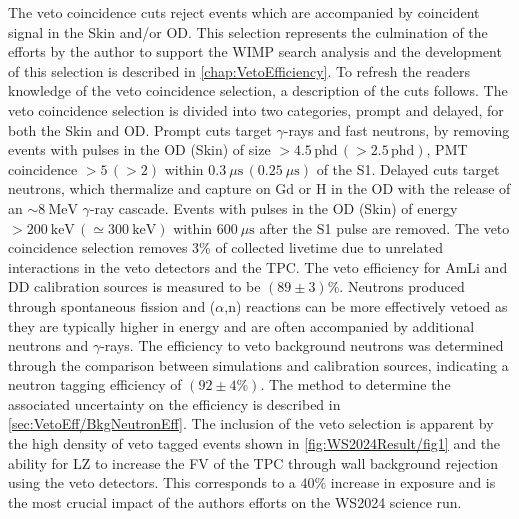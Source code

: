 The veto coincidence cuts reject events which are accompanied by coincident signal in the Skin and/or OD. This selection represents the culmination of the efforts by the author to support the WIMP search analysis and the development of this selection is described in \autoref{chap:VetoEfficiency}. To refresh the readers knowledge of the veto coincidence selection, a description of the cuts follows. 
The veto coincidence selection is divided into  two categories, prompt and delayed, for both the Skin and OD. Prompt cuts target $\gamma$-rays and fast neutrons, by removing events with pulses in the OD (Skin) of size $>4.5\,\text{phd}\,(>2.5\,\text{phd})$, PMT coincidence $>5\,(>2)$ within $0.3~\mu \text{s}\,(0.25~\mu \text{s})$ of the S1. Delayed cuts target neutrons, which thermalize and capture on Gd or H in the OD with the release of an $\sim8~\text{MeV}$ $\gamma$-ray cascade. Events with pulses in the OD (Skin) of energy $>200~\text{keV}\,(\simeq300~\text{keV})$ within $600~\mu\text{s}$ after the S1 pulse are removed. The veto coincidence selection removes $3\%$ of collected livetime due to unrelated interactions in the veto detectors and the TPC. The veto efficiency for AmLi and DD calibration sources is measured to be $(89\pm3)\%$. Neutrons produced through spontaneous fission and ($\alpha$,n) reactions can be more effectively vetoed as they are typically higher in energy and are often accompanied by additional neutrons and $\gamma$-rays. The efficiency to veto background neutrons was determined through the comparison between simulations and calibration sources, indicating a neutron tagging efficiency of  $(92\pm4\%)$. The method to determine the associated uncertainty on the efficiency is described in \autoref{sec:VetoEff/BkgNeutronEff}.
The inclusion of the veto selection is apparent by the high density of veto tagged events shown in \autoref{fig:WS2024Result/fig1} and the ability for LZ to increase the FV of the TPC through wall background rejection using the veto detectors. This corresponds to a $40\%$ increase in exposure and is the most crucial impact of the authors efforts on the WS2024 science run.

